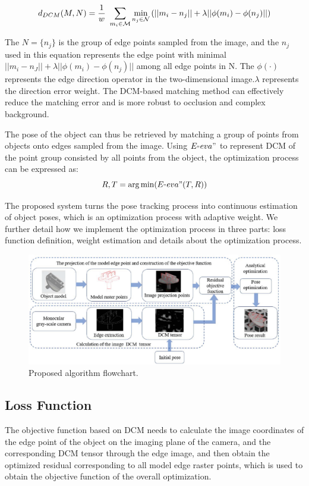\documentclass{cta-author}
\begin{document}
\begin{equation}\label{eq1}
  d_{DCM}(M,N)= {\frac{1}{w}\ \sum_{m_{i}\in \mathcal{M}}\min \limits_{n_{j}\in \mathcal{N}}\\
  (||m_{i}-n_{j}||+\lambda||\phi(m_{i})-\phi(n_{j})||)}
\end{equation}

The $N=\{n_j\}$ is the group of edge points sampled from the image, and the $ n_j $ used in this 
equation represents the edge point with minimal $||m_i-n_J||+\lambda||\phi(m_i)-\phi(n_j)||$ among all edge 
points in N. The $\phi(\cdot)$ represents the edge direction operator in the two-dimensional image.$\lambda$ 
represents the direction error weight. The DCM-based matching method 
can effectively reduce the matching error and is more robust to occlusion and complex background.

The pose of the object can thus be retrieved by matching a group of points from objects onto edges sampled from 
the image. Using $E_"eva"$ to represent DCM of the point group consisted by all points from the object, 
the optimization process can be expressed as: 
\begin{equation}\label{eq2}
  R,T = \arg\min(E_"eva"(T,R))
\end{equation}

The proposed system turns the pose tracking process into continuous estimation of object poses, which 
is an optimization process with adaptive weight. We further detail how we implement the optimization process 
in three parts: loss function definition, weight estimation and details about the optimization process.

\begin{figure}[!h]
\centering
\includegraphics{fig2.eps}
\caption{ Proposed algorithm flowchart.}
\label{2}
\end{figure}

\subsection{Loss Function}\label{sec3.2}
The objective function based on DCM needs to calculate the image coordinates of the 
edge point of the object on the imaging plane of the camera, and the corresponding DCM 
tensor through the edge image, and then obtain the optimized residual corresponding to all
model edge raster points, which is used to obtain the objective function of the overall optimization. 
\end{document}
